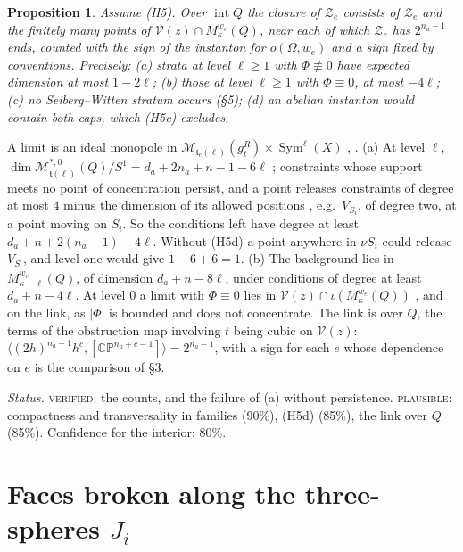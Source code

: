 \documentclass[10pt]{amsart}
\makeatletter
\numberwithin{equation}{section}
\theoremstyle{compact}
\newtheorem{proposition}[theorem]{Proposition}
\renewenvironment{proof}[1][\proofname]{\par\pushQED{\qed}\normalfont
  \topsep4\p@\relax\trivlist\item[\hskip\labelsep\itshape#1\@addpunct{.}]%
  \ignorespaces}{\popQED\endtrivlist\@endpefalse}
\newcommand{\CP}{\mathbb{CP}}
\newcommand{\Sym}{\operatorname{Sym}}
\newcommand{\ft}{\mathfrak t}
\newcommand{\cV}{\mathcal V}
\newcommand{\cM}{\mathcal M}
\newcommand{\cZ}{\mathcal Z}
\newcommand{\Ms}{\cM^{*,0}}
\newcommand{\step}[1]{\par\noindent\textit{#1}\enspace}
\newcommand{\ver}{\textsc{verified}}
\newcommand{\pla}{\textsc{plausible}}
\makeatother
\begin{document}
\begin{proposition}\label{prop:interior}
Assume \textup{(H5)}. Over $\operatorname{int}Q$ the closure of $\cZ_e$ consists
of $\cZ_e$ and the finitely many points of $\cV(z)\cap M^{w_e}_\kappa(Q)$, near
each of which $\cZ_e$ has $2^{n_a-1}$ ends, counted with the sign of the
instanton for $o(\Omega,w_e)$ and a sign fixed by conventions. Precisely:
\textup{(a)} strata at level $\ell\ge1$ with $\Phi\not\equiv0$ have expected
dimension at most $1-2\ell$; \textup{(b)} those at level $\ell\ge1$ with
$\Phi\equiv0$, at most $-4\ell$; \textup{(c)} no Seiberg--Witten stratum occurs
\textup{(\S5)}; \textup{(d)} an abelian instanton would contain both caps, which
\textup{(H5c)} excludes.
\end{proposition}

\begin{proof}[Sketch]
A limit is an ideal monopole in $\cM_{\ft_e(\ell)}(g^R_t)\times\Sym^\ell(X)$
\cite[Thm.~4.20]{FL1}, \cite[Thm.~2.12]{FL2a}. (a) At level $\ell$,
$\dim\Ms_{\ft(\ell)}(Q)/S^1=d_a+2n_a+n-1-6\ell$ \cite[(3.20)]{FL2b}; constraints whose support meets no point of concentration
persist, and a point releases constraints of degree at most $4$ minus the
dimension of its allowed positions \cite[(3.25)]{FL2b}, e.g.\ $V_{S_i}$, of
degree two, at a point moving on $S_i$. So the conditions left have degree at
least $d_a+n+2(n_a-1)-4\ell$. Without (H5d) a point anywhere in $\nu S_i$ could
release $V_{S_i}$, and level one would give $1-6+6=1$. (b) The background lies
in $M^{w_e}_{\kappa-\ell}(Q)$, of dimension $d_a+n-8\ell$, under conditions of
degree at least $d_a+n-4\ell$. At level $0$ a limit with $\Phi\equiv0$ lies in
$\cV(z)\cap\iota(M^{w_e}_\kappa(Q))$ \cite[Lemma~3.15]{FL2b}, and on the link,
as $|\Phi|$ is bounded and does not concentrate. The link is
\cite[Lemmas~3.22--3.28, Prop.~3.29]{FL2b} over $Q$, the terms of the
obstruction map involving $t$ being cubic on $\cV(z)$:
$\langle(2h)^{n_a-1}h^c,[\CP^{n_a+c-1}]\rangle=2^{n_a-1}$, with a sign for each
$e$ whose dependence on $e$ is the comparison of \S3.
\end{proof}

\step{Status.} \ver: the counts, and the failure of (a) without persistence.
\pla: compactness and transversality in families (90\%), (H5d) (85\%), the link
over $Q$ (85\%). Confidence for the interior: 80\%.

\section{Faces broken along the three-spheres $J_i$}
\end{document}
